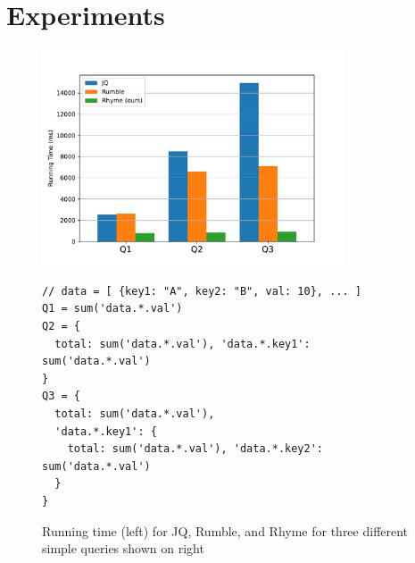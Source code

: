 \documentclass[runningheads]{llncs}
\begin{document}



\section{Experiments}\label{sec:experiments}

\begin{figure}[t]
\begin{minipage}{0.4\textwidth}
\centering
\includegraphics[width=0.8\textwidth]{images/plot.pdf}
\end{minipage}
\begin{minipage}{0.6\textwidth}
\begin{lstlisting}[style=JavaScriptTiny, columns=flexible]
// data = [ {key1: "A", key2: "B", val: 10}, ... ]
Q1 = sum('data.*.val')
Q2 = {
  total: sum('data.*.val'), 'data.*.key1': sum('data.*.val')
}
Q3 = {
  total: sum('data.*.val'),
  'data.*.key1': {
    total: sum('data.*.val'), 'data.*.key2': sum('data.*.val')
  }
}
\end{lstlisting}
\end{minipage}
\caption{Running time (left) for JQ, Rumble, and Rhyme for three different simple queries shown
on right
}\label{fig:plot}
\end{figure}
\end{document}
